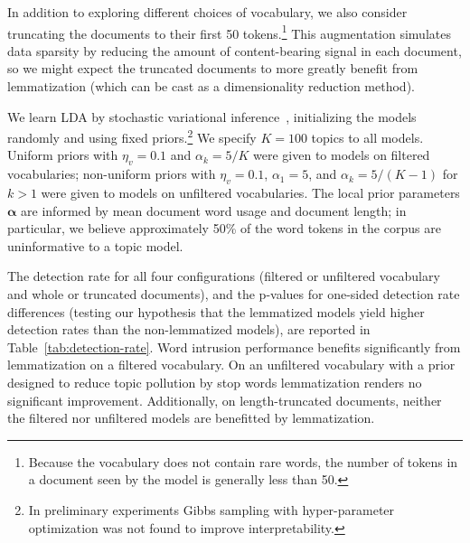 \documentclass[11pt,letterpaper]{article}
\renewcommand{\vec}{\boldsymbol}   %
\newcommand{\valpha}{{\vec{\alpha}}}
\begin{document}
{In addition to exploring different choices of vocabulary, we also
consider truncating the documents to their first 50 tokens.\footnote{
    Because the vocabulary does not contain rare words, the number of
    tokens in a document seen by the model is generally less than 50.
}
This augmentation simulates data sparsity by reducing the amount of
content-bearing signal in each document, so we might expect the
truncated documents to more greatly benefit from lemmatization (which
can be cast as a dimensionality reduction method).

We learn LDA by stochastic variational
inference~\cite{hoffman2013}, initializing the models randomly and
using fixed priors.\footnote{
    In preliminary experiments Gibbs
    sampling with hyper-parameter optimization was not found to improve
    interpretability.
}
We specify $K = 100$ topics to all models.
Uniform priors with $\eta_v = 0.1$ and
$\alpha_k = 5 / K$ were given to models on
filtered vocabularies; non-uniform priors with
$\eta_v = 0.1$, $\alpha_1 = 5$, and $\alpha_k = 5 / (K-1)$
for $k > 1$
were given to models on unfiltered vocabularies.
The local prior parameters $\valpha$ are informed by mean
document word usage and document length; in particular, we
believe approximately 50\% of the word tokens in the corpus are
uninformative to a topic model.

The detection rate for all four configurations (filtered or unfiltered
vocabulary and whole or truncated documents), and the
p-values for one-sided detection rate differences (testing our
hypothesis that the lemmatized models yield higher detection rates than
the non-lemmatized models), are reported in
Table~\ref{tab:detection-rate}.  Word intrusion performance benefits
significantly from lemmatization on a filtered vocabulary.  On an
unfiltered vocabulary with a prior designed to reduce topic pollution
by stop words lemmatization renders no significant improvement.
Additionally, on length-truncated documents, neither the filtered nor
unfiltered models are benefitted by lemmatization.

}
\end{document}
